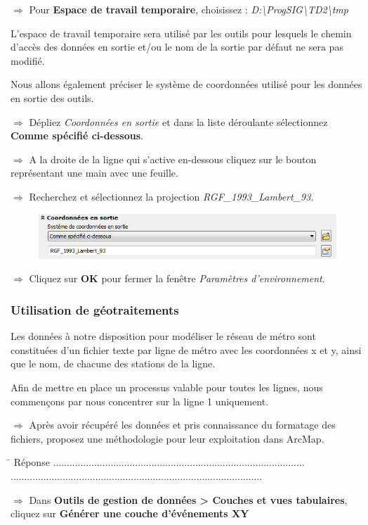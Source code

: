 \documentclass[11pt]{article}
\newcommand{\action}{$\Rightarrow$ }
\newcommand{\reponse}{
	\begin{tabbing}
	\hspace{2cm}\=\kill
	Réponse \> ............................................................................................ \\ 
 	\> ............................................................................................
	\end{tabbing}
}
\begin{document}
\action Pour \textbf{Espace de travail temporaire}, choisissez : \textit{D:\textbackslash{}ProgSIG\textbackslash{}TD2\textbackslash{}tmp}

L'espace de travail temporaire sera utilisé par les outils pour lesquels le chemin d'accès des données en sortie et/ou le nom de la sortie par défaut ne sera pas modifié.

Nous allons également préciser le système de coordonnées utilisé pour les données en sortie des outils.

\action Dépliez \textit{Coordonnées en sortie} et dans la liste déroulante sélectionnez \textbf{Comme spécifié ci-dessous}. 

\action A la droite de la ligne qui s'active en-dessous cliquez sur le bouton représentant une main avec une feuille.

\action Recherchez et sélectionnez la projection \textit{RGF\_1993\_Lambert\_93}.
\begin{figure}[H]
	\center \includegraphics{img/td3/environnements_coordonnees.png}\\
\end{figure}

\action Cliquez sur \textbf{OK} pour fermer la fenêtre \textit{Paramètres d'environnement}.


\subsubsection{Utilisation de géotraitements}
Les données à notre disposition pour modéliser le réseau de métro sont constituées d'un fichier texte par ligne de métro avec les coordonnées x et y, ainsi que le nom, de chacune des stations de la ligne.

Afin de mettre en place un processus valable pour toutes les lignes, nous commençons par nous concentrer sur la ligne 1 uniquement.

\action Après avoir récupéré les données et pris connaissance du formatage des fichiers, proposez une méthodologie pour leur exploitation dans ArcMap.

\reponse

\action Dans \textbf{Outils de gestion de données > Couches et vues tabulaires}, cliquez sur \textbf{Générer une couche d'événements XY}
\end{document}
